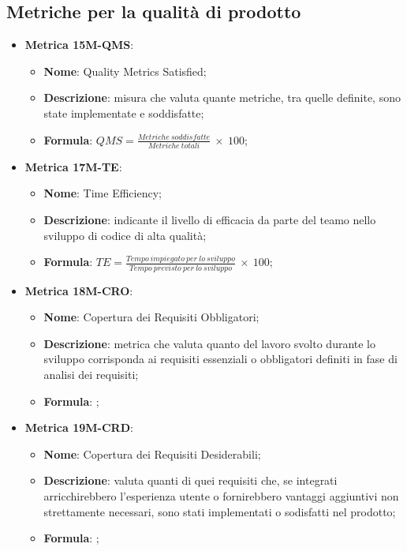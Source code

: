 \subsection{Metriche per la qualità di prodotto}

\begin{itemize}
    \item \textbf{Metrica 15M-QMS}:
    \begin{itemize}
        \item \textbf{Nome}: Quality Metrics Satisfied;
        \item \textbf{Descrizione}: misura che valuta quante metriche, tra quelle definite, sono state implementate e soddisfatte;
        \item \textbf{Formula}: $QMS = \frac{Metriche\: soddisfatte}{Metriche\: totali}\: \times \: 100$;
    \end{itemize}
\end{itemize}

\begin{itemize}
    \item \textbf{Metrica 17M-TE}:
    \begin{itemize}
        \item \textbf{Nome}: Time Efficiency;
        \item \textbf{Descrizione}: indicante il livello di efficacia da parte del teamo nello sviluppo di codice di alta qualità;
        \item \textbf{Formula}: $TE = \frac{Tempo\: impiegato\: per\: lo\: sviluppo}{Tempo\: previsto\: per\: lo\: sviluppo}\: \times \: 100$;
    \end{itemize}
\end{itemize}

\begin{itemize}
    \item \textbf{Metrica 18M-CRO}:
    \begin{itemize}
        \item \textbf{Nome}: Copertura dei Requisiti Obbligatori;
        \item \textbf{Descrizione}: metrica che valuta quanto del lavoro svolto durante lo sviluppo corrisponda ai requisiti essenziali o obbligatori definiti in fase di analisi dei requisiti;
        \item \textbf{Formula}: ;
    \end{itemize}
\end{itemize}

\begin{itemize}
    \item \textbf{Metrica 19M-CRD}:
    \begin{itemize}
        \item \textbf{Nome}: Copertura dei Requisiti Desiderabili;
        \item \textbf{Descrizione}: valuta quanti di quei requisiti che, se integrati arricchirebbero l'esperienza utente o fornirebbero vantaggi aggiuntivi non strettamente necessari, sono stati implementati o sodisfatti nel prodotto;
        \item \textbf{Formula}: ;
    \end{itemize}
\end{itemize}

